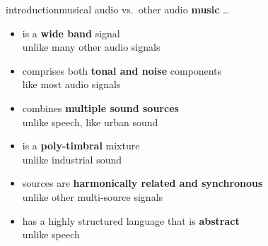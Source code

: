         \begin{frame}{introduction}{musical audio vs.\ other audio}
            \vspace{-3mm}
            \textbf{music} \ldots
            \begin{itemize}
                \item   is a \textbf{wide band} signal\\ unlike many other audio signals
                \item<2->   comprises both \textbf{tonal and noise} components\\ like most audio signals
                \item<3->   combines \textbf{multiple sound sources}\\ unlike speech, like urban sound
                \item<4->   is a \textbf{poly-timbral} mixture\\ unlike industrial sound
                \item<5->  sources are \textbf{harmonically related and synchronous}\\ unlike other multi-source signals
                \item<6->   has a highly structured language that is \textbf{abstract}\\ unlike speech
            \end{itemize}
        \end{frame}
        
